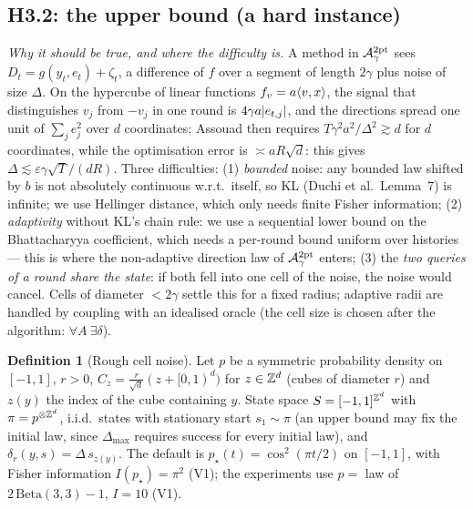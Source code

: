 \documentclass[11pt,a4paper]{article}
\numberwithin{equation}{section}
\theoremstyle{definition}
\newtheorem{definition}[theorem]{Definition}
\theoremstyle{remark}
\newcommand{\Dmax}{\Delta_{\max}}\newcommand{\Dcp}{\Delta_{\rm cp}}\newcommand{\Dlow}{\Delta_{\rm low}}
\begin{document}
\subsection{H3.2: the upper bound (a hard instance)}\label{sec:upper}
\emph{Why it should be true, and where the difficulty is.} A method in $\mathcal A^{\rm 2pt}_\gamma$ sees $D_t=g(y_t,e_t)+\zeta_t$, a difference of $f$ over a segment of length $2\gamma$ plus noise of size $\Delta$. On the hypercube of linear functions $f_v=a\langle v,x\rangle$, the signal that distinguishes $v_j$ from $-v_j$ in one round is $4\gamma a\lvert e_{t,j}\rvert$, and the directions spread one unit of $\sum_je_j^2$ over $d$ coordinates; Assouad then requires $T\gamma^2a^2/\Delta^2\gtrsim d$ for $d$ coordinates, while the optimisation error is $\asymp aR\sqrt d$: this gives $\Delta\lesssim\varepsilon\gamma\sqrt T/(dR)$. Three difficulties: (1) \emph{bounded} noise: any bounded law shifted by $b$ is not absolutely continuous w.r.t.\ itself, so KL (Duchi et al.\ Lemma~7) is infinite; we use Hellinger distance, which only needs finite Fisher information; (2) \emph{adaptivity} without KL's chain rule: we use a sequential lower bound on the Bhattacharyya coefficient, which needs a per-round bound uniform over histories --- this is where the non-adaptive direction law of $\mathcal A^{\rm 2pt}_\gamma$ enters; (3) the \emph{two queries of a round share the state}: if both fell into one cell of the noise, the noise would cancel. Cells of diameter $<2\gamma$ settle this for a fixed radius; adaptive radii are handled by coupling with an idealised oracle (the cell size is chosen after the algorithm: $\forall A\ \exists\delta$).

\begin{definition}[Rough cell noise]\label{def:noise}
Let $p$ be a symmetric probability density on $[-1,1]$, $r>0$, $C_z=\frac r{\sqrt d}(z+[0,1)^d)$ for $z\in\mathbb Z^d$ (cubes of diameter $r$) and $z(y)$ the index of the cube containing $y$. State space $S=[-1,1]^{\mathbb Z^d}$ with $\pi=p^{\otimes\mathbb Z^d}$, i.i.d.\ states with stationary start $s_1\sim\pi$ (an upper bound may fix the initial law, since $\Dmax$ requires success for every initial law), and $\delta_r(y,s)=\Delta\,s_{z(y)}$. The default is $p_\star(t)=\cos^2(\pi t/2)$ on $[-1,1]$, with Fisher information $I(p_\star)=\pi^2$ (V1); the experiments use $p=$ law of $2\,\mathrm{Beta}(3,3)-1$, $I=10$ (V1).
\end{definition}
\end{document}
